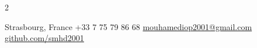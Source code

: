 \documentclass[lighthipster]{simplehipstercv}
\newlength{\rightcolwidth}
\begin{document}
\begin{paracol}{2}
\vfill{}

\setlength{\parindent}{0pt}
\begin{minipage}[t]{\rightcolwidth}
\begin{center}\fontfamily{\sfdefault}\selectfont \color{black!70}
{\small{} Strasbourg, France  +33 7 75 79 86 68 \newline{} \protect\url{mouhamediop2001@gmail.com}  \protect\url{github.com/smhd2001}}
\end{center}
\end{minipage}

\end{paracol}
\end{document}
